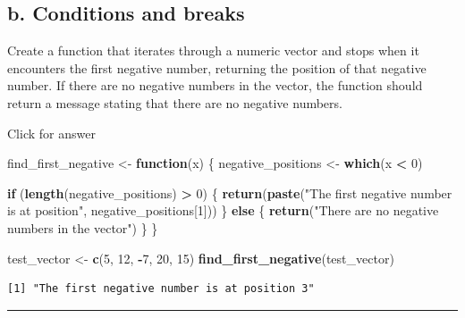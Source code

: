\documentclass[
]{book}
\newenvironment{Shaded}{\begin{snugshade}}{\end{snugshade}}
\newcommand{\ControlFlowTok}[1]{\textcolor[rgb]{0.13,0.29,0.53}{\textbf{#1}}}
\newcommand{\DecValTok}[1]{\textcolor[rgb]{0.00,0.00,0.81}{#1}}
\newcommand{\FunctionTok}[1]{\textcolor[rgb]{0.13,0.29,0.53}{\textbf{#1}}}
\newcommand{\NormalTok}[1]{#1}
\newcommand{\OtherTok}[1]{\textcolor[rgb]{0.56,0.35,0.01}{#1}}
\newcommand{\SpecialCharTok}[1]{\textcolor[rgb]{0.81,0.36,0.00}{\textbf{#1}}}
\newcommand{\StringTok}[1]{\textcolor[rgb]{0.31,0.60,0.02}{#1}}
\begin{document}
\hypertarget{b.-conditions-and-breaks}{%
\subsection{b. Conditions and breaks}\label{b.-conditions-and-breaks}}

Create a function that iterates through a numeric vector and stops when it encounters the first negative number, returning the position of that negative number. If there are no negative numbers in the vector, the function should return a message stating that there are no negative numbers.

Click for answer

\begin{Shaded}
\begin{Highlighting}[]
\NormalTok{find\_first\_negative }\OtherTok{\textless{}{-}} \ControlFlowTok{function}\NormalTok{(x) \{}
\NormalTok{  negative\_positions }\OtherTok{\textless{}{-}} \FunctionTok{which}\NormalTok{(x }\SpecialCharTok{\textless{}} \DecValTok{0}\NormalTok{)}
  
  \ControlFlowTok{if}\NormalTok{ (}\FunctionTok{length}\NormalTok{(negative\_positions) }\SpecialCharTok{\textgreater{}} \DecValTok{0}\NormalTok{) \{}
    \FunctionTok{return}\NormalTok{(}\FunctionTok{paste}\NormalTok{(}\StringTok{"The first negative number is at position"}\NormalTok{, negative\_positions[}\DecValTok{1}\NormalTok{]))}
\NormalTok{  \} }\ControlFlowTok{else}\NormalTok{ \{}
    \FunctionTok{return}\NormalTok{(}\StringTok{"There are no negative numbers in the vector"}\NormalTok{)}
\NormalTok{  \}}
\NormalTok{\}}
\end{Highlighting}
\end{Shaded}

\begin{Shaded}
\begin{Highlighting}[]
\NormalTok{test\_vector }\OtherTok{\textless{}{-}} \FunctionTok{c}\NormalTok{(}\DecValTok{5}\NormalTok{, }\DecValTok{12}\NormalTok{, }\SpecialCharTok{{-}}\DecValTok{7}\NormalTok{, }\DecValTok{20}\NormalTok{, }\DecValTok{15}\NormalTok{)}
\FunctionTok{find\_first\_negative}\NormalTok{(test\_vector)}
\end{Highlighting}
\end{Shaded}

\begin{verbatim}
[1] "The first negative number is at position 3"
\end{verbatim}

\begin{center}\rule{0.5\linewidth}{0.5pt}\end{center}
\end{document}
